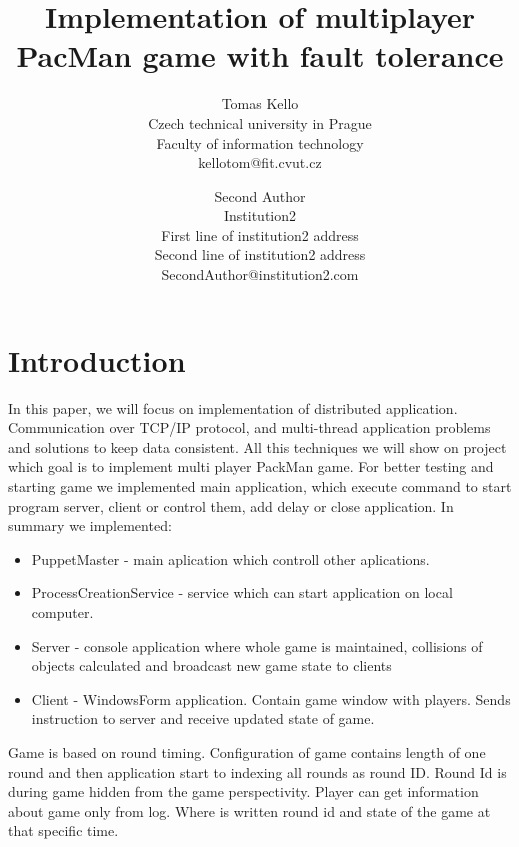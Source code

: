 \documentclass[times, 10pt,twocolumn]{article}
\begin{document}
\title{Implementation of multiplayer PacMan game with fault tolerance}

\author{Tomas Kello\\
Czech technical university in Prague\\ Faculty of information technology \\ kellotom@fit.cvut.cz\\
\and
Second Author\\
Institution2\\
First line of institution2 address\\ Second line of institution2 address\\ 
SecondAuthor@institution2.com\\
}

\maketitle
\thispagestyle{empty}

\begin{abstract}
   
\end{abstract}



\section{Introduction}

In this paper, we will focus on implementation of distributed application. Communication over TCP/IP protocol, and multi-thread application problems and solutions to keep data consistent. All this techniques we will show on project which goal is to implement multi player PackMan game. For better testing and starting game we implemented main application, which execute command to start program server, client or control them, add delay or close application.
In summary we implemented:
\begin{itemize}
	\item PuppetMaster - main aplication which controll other aplications.
	\item ProcessCreationService - service which can start application on local computer.
	\item Server - console application where whole game is maintained, collisions of objects calculated and broadcast new game state to clients
	\item Client - WindowsForm application. Contain game window with players. Sends instruction to server and receive updated state of game.
\end{itemize}
Game is based on round timing. Configuration of game contains length of one round and then application start to indexing all rounds as round ID. Round Id is during game hidden from the game perspectivity. Player can get information about game only from log. Where is written round id and state of the game at that specific time.
\end{document}
